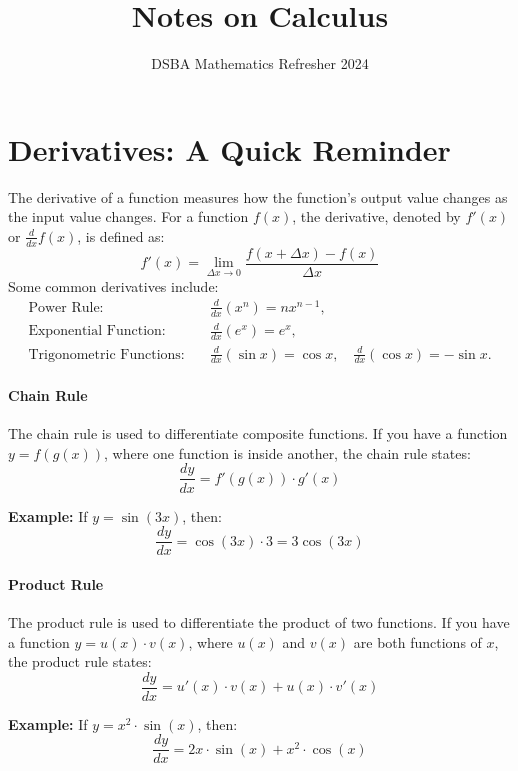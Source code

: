 \documentclass[]{article}
\title{Notes on Calculus}
\author{DSBA Mathematics Refresher 2024}
\date{}
\begin{document}
	
	\maketitle
	
	\begin{abstract}
		
	\end{abstract}
	
	
	\section{Derivatives: A Quick Reminder}
	The derivative of a function measures how the function's output value changes as the input value changes.
	For a function $f(x)$, the derivative, denoted by $f'(x)$ or $\frac{d}{dx}f(x)$, is defined as:
	$$
	f'(x) = \lim_{\Delta x \to 0} \frac{f(x+\Delta x) - f(x)}{\Delta x}
	$$
	Some common derivatives include:
	\begin{align*}
		\text{Power Rule:} & \quad \frac{d}{dx} \left( x^n \right) = nx^{n-1}, \\
		\text{Exponential Function:} & \quad \frac{d}{dx} \left( e^x \right) = e^x, \\
		\text{Trigonometric Functions:} & \quad \frac{d}{dx} \left( \sin x \right) = \cos x, \quad \frac{d}{dx} \left( \cos x \right) = -\sin x.
	\end{align*}
	
	\paragraph{Chain Rule}
	The chain rule is used to differentiate composite functions.
	 If you have a function $y = f(g(x))$, where one function is inside another, the chain rule states:
	$$
	\frac{dy}{dx} = f'(g(x)) \cdot g'(x)
	$$
	
	\noindent \textbf{Example:}
	If $y = \sin(3x)$, then:
	$$
	\frac{dy}{dx} = \cos(3x) \cdot 3 = 3\cos(3x)
	$$
	
	\paragraph{Product Rule}
	The product rule is used to differentiate the product of two functions.
	If you have a function $y = u(x) \cdot v(x)$, where $u(x)$ and $v(x)$ are both functions of $x$, the product rule states:
	$$
	\frac{dy}{dx} = u'(x) \cdot v(x) + u(x) \cdot v'(x)
	$$
	
	\noindent \textbf{Example:}
	If $y = x^2 \cdot \sin(x)$, then:
	$$
	\frac{dy}{dx} = 2x \cdot \sin(x) + x^2 \cdot \cos(x)
	$$
	
\end{document}
